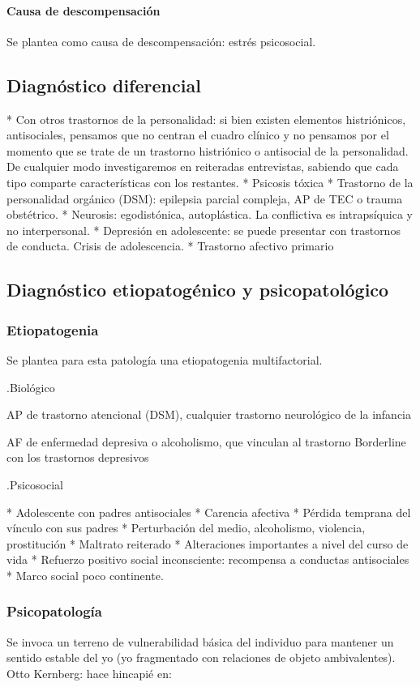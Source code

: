 \documentclass{scrbook}
\begin{document}
\paragraph{Causa de descompensación}
Se plantea como causa de descompensación: estrés psicosocial.
\subsection*{Diagnóstico diferencial}

* Con otros trastornos de la personalidad: si bien existen elementos histriónicos, antisociales, pensamos que no centran el cuadro clínico y no pensamos por el momento que se trate de un trastorno histriónico o antisocial de la personalidad. De cualquier modo investigaremos en reiteradas entrevistas, sabiendo que cada tipo comparte características con los restantes.
* Psicosis tóxica
* Trastorno de la personalidad orgánico (DSM): epilepsia parcial compleja, AP de TEC o trauma obstétrico.
* Neurosis: egodistónica, autoplástica. La conflictiva es intrapsíquica y no interpersonal.
* Depresión en adolescente: se puede presentar con trastornos de conducta. Crisis de adolescencia.
* Trastorno afectivo primario

\subsection*{Diagnóstico etiopatogénico y psicopatológico}
\subsubsection*{Etiopatogenia}
Se plantea para esta patología una etiopatogenia multifactorial.

.Biológico

AP de trastorno atencional (DSM), cualquier trastorno neurológico de la infancia

AF de enfermedad depresiva o alcoholismo, que vinculan al trastorno Borderline con los trastornos depresivos

.Psicosocial

* Adolescente con padres antisociales
* Carencia afectiva
* Pérdida temprana del vínculo con sus padres
* Perturbación del medio, alcoholismo, violencia, prostitución
* Maltrato reiterado
* Alteraciones importantes a nivel del curso de vida
* Refuerzo positivo social inconsciente: recompensa a conductas antisociales
* Marco social poco continente.
\subsubsection*{Psicopatología}
Se invoca un terreno de vulnerabilidad básica del individuo para mantener un sentido estable del yo (yo fragmentado con relaciones de objeto ambivalentes). Otto Kernberg: hace hincapié en:
\end{document}
